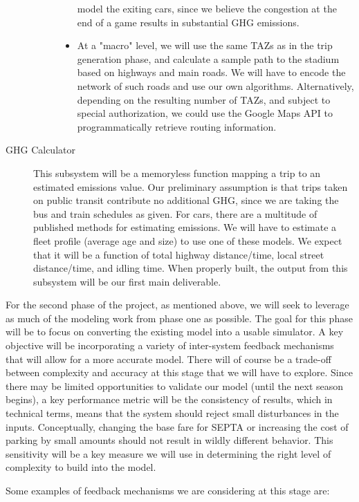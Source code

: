\documentclass[draft,12pt,titlepage]{article}
\begin{document}
\begin{description}
\begin{description}
\begin{itemize}
model the exiting cars, since we believe the congestion at the end of a game
results in substantial GHG emissions.
          \item At a "macro" level, we will use the same TAZs as in the trip generation phase,
and calculate a sample path to the stadium based on highways and main roads.
We will have to encode the network of such roads and use our own algorithms.
Alternatively, depending on the resulting number of TAZs, and subject to special
authorization, we could use the Google Maps API to programmatically retrieve
routing information.
        \end{itemize}
    \end{description}
  \item[GHG Calculator] \hfill This subsystem will be a memoryless function mapping a trip to
an estimated emissions value. Our preliminary assumption is that trips taken on
public transit contribute no additional GHG, since we are taking the bus and train
schedules as given. For cars, there are a multitude of published methods for
estimating emissions. We will have to estimate a fleet profile (average age and size)
to use one of these models. We expect that it will be a function of total highway
distance/time, local street distance/time, and idling time. When properly built, the
output from this subsystem will be our first main deliverable.
\end{description}

For the second phase of the project, as mentioned above, we will seek to leverage as much of
the modeling work from phase one as possible. The goal for this phase will be to focus on
converting the existing model into a usable simulator. A key objective will be incorporating a
variety of inter-system feedback mechanisms that will allow for a more accurate model.
There will of course be a trade-off between complexity and accuracy at this stage that we will
have to explore. Since there may be limited opportunities to validate our model (until the next
season begins), a key performance metric will be the consistency of results, which in
technical terms, means that the system should reject small disturbances in the inputs.
Conceptually, changing the base fare for SEPTA or increasing the cost of parking by small
amounts should not result in wildly different behavior. This sensitivity will be a key measure
we will use in determining the right level of complexity to build into the model.

Some examples of feedback mechanisms we are considering at this stage are:
\end{document}
